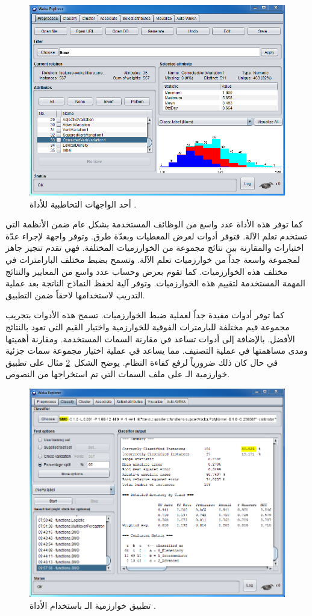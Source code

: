 \begin{figure}[htb]
	\centering
	\includegraphics[width=0.9\linewidth]{images/weka.png}
	\caption{%
		أحد الواجهات التخاطبية للأداة .
	}
	\label{fig:weka:gui}
\end{figure}

كما توفر هذه الأداة عدد واسع من الوظائف المستخدمة بشكل عام ضمن الأنظمة التي تستخدم تعلم الآلة.
فتوفر أدوات لعرض المعطيات وبعدّة طرق.
وتوفر واجهة لإجراء عدّة اختبارات والمقارنة بين نتائج مجموعة من الخوارزميات المختلفة.
فهي تقدم تنجيز جاهز  لمجموعة واسعة جداً من خوارزميات تعلم الآلة.
وتسمح بضبط مختلف البارامترات في مختلف هذه الخوارزميات.
كما تقوم بعرض وحساب عدد واسع من المعايير والنتائج المهمة المستخدمة لتقييم هذه الخوارزميات.
وتوفر آلية لحفظ النماذج الناتجة بعد عملية التدريب لاستخدامها لاحقاً ضمن التطبيق.
	
كما توفر أدوات مفيدة جداً لعملية ضبط الخوارزميات.
تسمح هذه الأدوات بتجريب مجموعة قيم مختلفة للبارمترات الفوقية للخوارزمية
واختيار القيم التي تعود بالنتائج الأفضل.
بالإضافة إلى أدوات تساعد في مقارنة السمات المستخدمة.
ومقارنة أهميتها ومدى مساهمتها في عملية التصنيف.
مما يساعد في عملية اختيار مجموعة سمات جزئية  في حال كان ذلك ضرورياً لرفع كفاءة النظام.
يوضح الشكل~\ref{fig:weka:ex} مثال على تطبيق خوارزمية الـ 
على ملف السمات التي تم استخراجها من النصوص.

\begin{figure}[htb]
	\centering
	\includegraphics[width=0.9\linewidth]{images/weka-ex.png}
	\caption{%
		تطبيق خوارزمية الـ  باستخدام الأداة .
	}
	\label{fig:weka:ex}
\end{figure}


